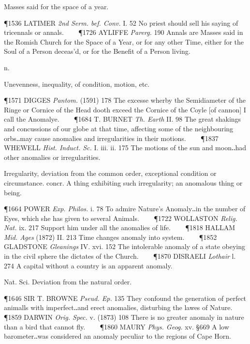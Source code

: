 \begin{description}[wide, labelwidth=!, labelindent=0pt]
\begin{myenumerate}
 Masses said for the space of a year. 

\P 1536 LATIMER \textit{2nd Serm. bef. Conv.} I. 52 No priest should sell his saying of
tricennals or annals.    
\P 1726 AYLIFFE \textit{Parerg.} 190 Annals are Masses said in the
Romish Church for the Space of a Year, or for any other Time, either for the
Soul of a Person deceas'd, or for the Benefit of a Person living.
\end{myenumerate}

  n.

\noindent  {}

\vspace{-0.3cm}

\begin{myenumerate}
 Unevenness, inequality, of condition, motion, etc. 

\P 1571 DIGGES \textit{Pantom.} (1591) 178 The excesse wherby the Semidiameter of the
Ringe or Cornice of the Head dooth exceed the Cornice of the Coyle [of cannon] I
call the Anomalye.    
\P 1684 T. BURNET \textit{Th. Earth} II. 98 The great shakings and
concussions of our globe at that time, affecting some of the neighbouring
orbs‥may cause anomalies and irregularities in their motions.    
\P 1837 WHEWELL \textit{Hist. Induct. Sc.} I. iii. ii. 175 The motions of the sun and moon‥had other
anomalies or irregularities.

 Irregularity, deviation from the common order, exceptional condition or
circumstance. concr. A thing exhibiting such irregularity; an anomalous thing or
being. 

\P 1664 POWER \textit{Exp. Philos.} i. 78 To admire Nature's Anomaly‥in the number of
Eyes, which she has given to several Animals.    
\P 1722 WOLLASTON \textit{Relig. Nat.} ix. 217 Support him under all the anomalies of life.    
\P 1818 HALLAM \textit{Mid. Ages} (1872) II. 213 Time changes anomaly into system.    
\P 1852 GLADSTONE \textit{Gleanings} IV. xvi.
152 The intolerable anomaly of a state obeying in the civil sphere the dictates
of the Church.    
\P 1870 DISRAELI \textit{Lothair} l. 274 A capital without a country is an
apparent anomaly.

 Nat. Sci. Deviation from the natural order. 

\P 1646 SIR T. BROWNE \textit{Pseud. Ep.} 135 They confound the generation of perfect
animalls with imperfect‥and erect anomalies, disturbing the lawes of Nature.
\P 1859 DARWIN \textit{Orig. Spec.} v. (1873) 108 There is no greater anomaly in nature
than a bird that cannot fly.    
\P 1860 MAURY \textit{Phys. Geog.} xv. §669 A low
barometer‥was considered an anomaly peculiar to the regions of Cape Horn.


\end{myenumerate}
\end{description}
